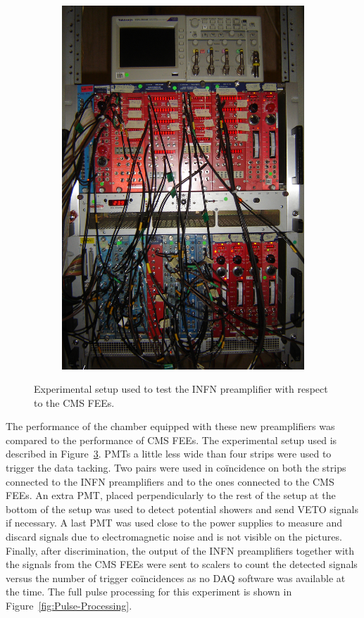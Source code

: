 \begin{figure}[H]
\begin{subfigure}{0.5\linewidth}
			\caption{\label{fig:Setup-GIF:B}}
		\end{subfigure}
		\begin{subfigure}{0.5\linewidth}
		    \centering
			\includegraphics[width = 0.9\linewidth]{fig/chapt6/Pulse-processing-GIF.JPG}
			\caption{\label{fig:Setup-GIF:C}}
		\end{subfigure}
		\caption{\label{fig:Setup-GIF} Experimental setup used to test the INFN preamplifier with respect to the CMS FEEs.}
    \end{figure}
	
	The performance of the chamber equipped with these new preamplifiers was compared to the performance of CMS FEEs. The experimental setup used is described in Figure~\ref{fig:Setup-GIF}. PMTs a little less wide than four strips were used to trigger the data tacking. Two pairs were used in coïncidence on both the strips connected to the INFN preamplifiers and to the ones connected to the CMS FEEs. An extra PMT, placed perpendicularly to the rest of the setup at the bottom of the setup was used to detect potential showers and send VETO signals if necessary. A last PMT was used close to the power supplies to measure and discard signals due to electromagnetic noise and is not visible on the pictures. Finally, after discrimination, the output of the INFN preamplifiers together with the signals from the CMS FEEs were sent to scalers to count the detected signals versus the number of trigger coïncidences as no DAQ software was available at the time. The full pulse processing for this experiment is shown in Figure~\ref{fig:Pulse-Processing}.
	 
